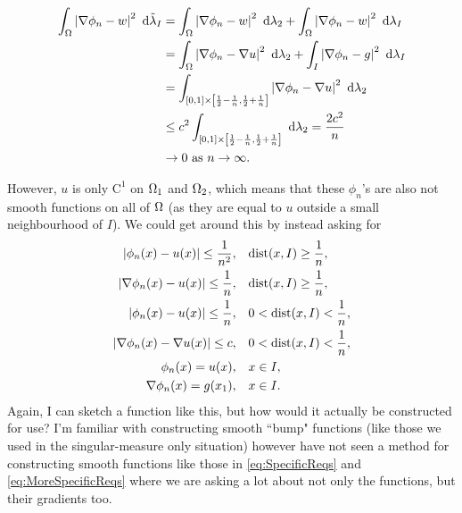 \documentclass[11pt]{report}
\theoremstyle{plain}
\newcommand{\tlambda}{\tilde{\lambda}}
\begin{document}
	\begin{subequations}
		\begin{align}
			\integral{\ddom}{\abs{\grad\phi_n - w}^2}{\tlambda_I}
			&= \integral{\ddom}{\abs{\grad\phi_n - w}^2}{\lambda_2} + \integral{\ddom}{\abs{\grad\phi_n - w}^2}{\lambda_I} \\
			&= \integral{\ddom}{\abs{\grad\phi_n - \grad u}^2}{\lambda_2} + \integral{I}{\abs{\grad\phi_n - g}^2}{\lambda_I} \\
			&= \integral{\sqbracs{0,1}\times\sqbracs{\recip{2}-\recip{n},\recip{2}+\recip{n}}}{\abs{\grad\phi_n - \grad u}^2}{\lambda_2} \\
			&\leq c^2\integral{\sqbracs{0,1}\times\sqbracs{\recip{2}-\recip{n},\recip{2}+\recip{n}}}{}{\lambda_2} = \frac{2c^2}{n} \\
			&\rightarrow 0 \toInfty{n}.
		\end{align}
	\end{subequations}
	
	However, $u$ is only $\mathrm{C}^1$ on $\Omega_1$ and $\Omega_2$, which means that these $\phi_n$'s are also not smooth functions on all of $\Omega$ (as they are equal to $u$ outside a small neighbourhood of $I$).
	We could get around this by instead asking for
	\begin{subequations} \label{eq:MoreSpecificReqs}
		\begin{align}
			\left\lvert \phi_n(x) - u(x) \right\rvert \leq \frac{1}{n^2}, &\quad \mathrm{dist}(x,I)\geq\frac{1}{n}, \\
			\left\lvert \nabla\phi_n(x) - u(x) \right\rvert \leq \frac{1}{n}, &\quad \mathrm{dist}(x,I)\geq\frac{1}{n}, \\
			\left\lvert \phi_n(x) - u(x) \right\rvert \leq \frac{1}{n}, &\quad 0<\mathrm{dist}(x,I)<\frac{1}{n}, \\
			\left\lvert \nabla\phi_n(x) - \nabla u(x) \right\rvert \leq c, &\quad 0<\mathrm{dist}(x,I)<\frac{1}{n}, \\
			\phi_n(x) = u(x), &\quad x\in I, \\
			\nabla\phi_n(x) = g(x_1), &\quad x\in I.
		\end{align}
	\end{subequations}
	Again, I can sketch a function like this, but how would it actually be constructed for use?
	I'm familiar with constructing smooth ``bump" functions (like those we used in the singular-measure only situation) however have not seen a method for constructing smooth functions like those in \eqref{eq:SpecificReqs} and \eqref{eq:MoreSpecificReqs} where we are asking a lot about not only the functions, but their gradients too.
	
\end{document}
